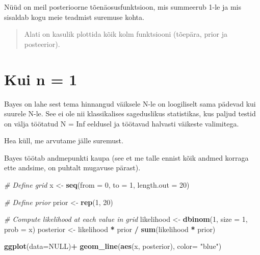 \documentclass[]{book}
\newenvironment{Shaded}{\begin{snugshade}}{\end{snugshade}}
\newcommand{\KeywordTok}[1]{\textcolor[rgb]{0.13,0.29,0.53}{\textbf{#1}}}
\newcommand{\DataTypeTok}[1]{\textcolor[rgb]{0.13,0.29,0.53}{#1}}
\newcommand{\DecValTok}[1]{\textcolor[rgb]{0.00,0.00,0.81}{#1}}
\newcommand{\StringTok}[1]{\textcolor[rgb]{0.31,0.60,0.02}{#1}}
\newcommand{\CommentTok}[1]{\textcolor[rgb]{0.56,0.35,0.01}{\textit{#1}}}
\newcommand{\OtherTok}[1]{\textcolor[rgb]{0.56,0.35,0.01}{#1}}
\newcommand{\OperatorTok}[1]{\textcolor[rgb]{0.81,0.36,0.00}{\textbf{#1}}}
\newcommand{\NormalTok}[1]{#1}
\begin{document}
Nüüd on meil posterioorne tõenäosusfunktsioon, mis summeerub 1-le ja mis
sisaldab kogu meie teadmist suremuse kohta.

\begin{quote}
Alati on kasulik plottida kõik kolm funktsiooni (tõepära, prior ja
posteerior).
\end{quote}

\section*{Kui n = 1}\label{kui-n-1}

Bayes on lahe sest tema hinnangud väiksele N-le on loogiliselt sama
pädevad kui suurele N-le. See ei ole nii klassikalises sageduslikus
statistikas, kus paljud testid on välja töötatud N = Inf eeldusel ja
töötavad halvasti väikeste valimitega.

Hea küll, me arvutame jälle suremust.

Bayes töötab andmepunkti kaupa (see et me talle ennist kõik andmed
korraga ette andsime, on puhtalt mugavuse pärast).



\begin{Shaded}
\begin{Highlighting}[]
\CommentTok{# Define grid}
\NormalTok{x <-}\StringTok{ }\KeywordTok{seq}\NormalTok{(}\DataTypeTok{from =} \DecValTok{0}\NormalTok{, }\DataTypeTok{to =} \DecValTok{1}\NormalTok{, }\DataTypeTok{length.out =} \DecValTok{20}\NormalTok{)}

\CommentTok{# Define prior}
\NormalTok{prior <-}\StringTok{ }\KeywordTok{rep}\NormalTok{(}\DecValTok{1}\NormalTok{, }\DecValTok{20}\NormalTok{)}

\CommentTok{# Compute likelihood at each value in grid}
\NormalTok{likelihood <-}\StringTok{ }\KeywordTok{dbinom}\NormalTok{(}\DecValTok{1}\NormalTok{, }\DataTypeTok{size =} \DecValTok{1}\NormalTok{, }\DataTypeTok{prob =}\NormalTok{ x)}
\NormalTok{posterior <-}\StringTok{ }\NormalTok{likelihood }\OperatorTok{*}\StringTok{ }\NormalTok{prior }\OperatorTok{/}\StringTok{ }\KeywordTok{sum}\NormalTok{(likelihood }\OperatorTok{*}\StringTok{ }\NormalTok{prior)}

\KeywordTok{ggplot}\NormalTok{(}\DataTypeTok{data=}\OtherTok{NULL}\NormalTok{)}\OperatorTok{+}
\StringTok{  }\KeywordTok{geom_line}\NormalTok{(}\KeywordTok{aes}\NormalTok{(x, posterior), }\DataTypeTok{color=} \StringTok{"blue"}\NormalTok{)}
\end{Highlighting}
\end{Shaded}
\end{document}
